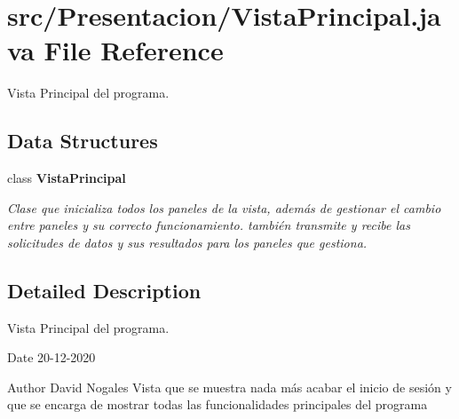 \section{src/\+Presentacion/\+Vista\+Principal.java File Reference}
\label{_vista_principal_8java}


Vista Principal del programa.  


\subsection*{Data Structures}
\begin{DoxyCompactItemize}
\item 
class \textbf{ Vista\+Principal}
\begin{DoxyCompactList}\small\item\em Clase que inicializa todos los paneles de la vista, además de gestionar el cambio entre paneles y su correcto funcionamiento. también transmite y recibe las solicitudes de datos y sus resultados para los paneles que gestiona. \end{DoxyCompactList}\end{DoxyCompactItemize}


\subsection{Detailed Description}
Vista Principal del programa. 

\begin{DoxyDate}{Date}
20-\/12-\/2020 
\end{DoxyDate}
\begin{DoxyAuthor}{Author}
David Nogales Vista que se muestra nada más acabar el inicio de sesión y que se encarga de mostrar todas las funcionalidades principales del programa 
\end{DoxyAuthor}
